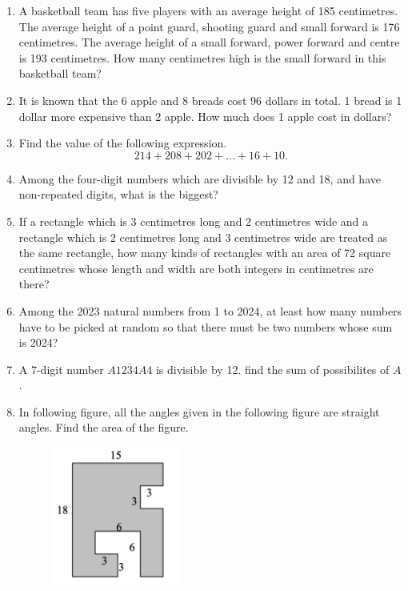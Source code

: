 \documentclass[11pt]{scrartcl}
\begin{document}
\begin{enumerate}
    \item  A basketball team has five players with an average height of 185 centimetres. The average height of a point guard, shooting guard and small forward is 176 centimetres. The average height of a small forward, power forward and centre is 193 centimetres. How many centimetres high is the small forward in this basketball team?

    

    \item  It is known that the 6 apple and 8 breads cost 96 dollars in total. 1 bread is 1 dollar more expensive than 2 apple. How much does 1 apple cost in dollars?

    \item  Find the value of the following expression.
    $$214+208+202+\dots+16+10.$$

    

    \item  Among the four-digit numbers which are divisible by 12 and 18, and have non-repeated digits, what is the biggest?

    \item  If a rectangle which is 3 centimetres long and 2 centimetres wide and a rectangle which is 2 centimetres long and 3 centimetres wide are treated as the same rectangle, how many kinds of rectangles with an area of 72 square centimetres whose length and width are both integers in centimetres are there?

    

    \item  Among the 2023 natural numbers from 1 to 2024, at least how many numbers have to be picked at random so that there must be two numbers whose sum is 2024?

    \item  A 7-digit number $\overline{A1234A4}$ is divisible by 12. find the sum of possibilites of $A$.


    \item In following figure, all the angles given in the following figure are straight angles. Find the area of the figure.
    \begin{figure}[h]
        \centering
        \includegraphics[width=0.4\textwidth]{StarGen/0Figure/nazi-area.png}
    \end{figure}
    

\end{enumerate}
\end{document}
